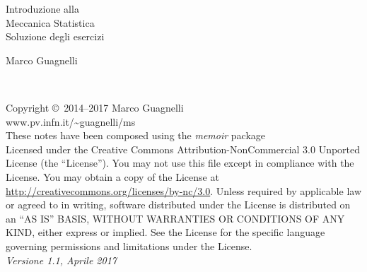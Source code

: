 \begingroup
\thispagestyle{empty}
{\flushright
\vspace*{6cm}
\par\normalfont\fontsize{35}{35}\sffamily\selectfont

Introduzione alla \\
\vspace*{16pt}
Meccanica Statistica \\
\vspace*{32pt}
Soluzione degli esercizi\par %

\vspace*{2cm}
{\huge Marco Guagnelli}\par %
}
\endgroup


\newpage
~\vfill
\thispagestyle{empty}

\noindent Copyright \copyright\ 2014--2017 Marco Guagnelli\\ %

\noindent www.pv.infn.it/\textasciitilde guagnelli/ms\\ %

\noindent These notes have been composed using the {\em memoir} package\\

\noindent Licensed under the Creative Commons Attribution-NonCommercial 3.0 Unported License (the ``License''). You may not use this file except in compliance with the License. You may obtain a copy of the License at \url{http://creativecommons.org/licenses/by-nc/3.0}. Unless required by applicable law or agreed to in writing, software distributed under the License is distributed on an \textsc{``AS IS'' BASIS, WITHOUT WARRANTIES OR CONDITIONS OF ANY KIND}, either express or implied. See the License for the specific language governing permissions and limitations under the License.\\ %

\noindent \textit{Versione 1.1, Aprile 2017} %
\cleardoublepage


\pagestyle{empty} %
\tableofcontents %
\cleardoublepage %
\pagestyle{ruled} %



